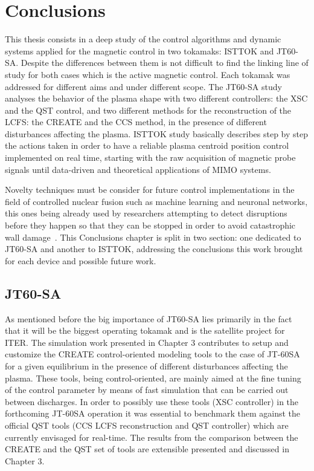 \chapter{Conclusions}

This thesis consists in a deep study of the control algorithms and dynamic systems applied for the magnetic control in two tokamaks: ISTTOK and JT60-SA. Despite the  differences between them is not difficult to find the  linking line of study for both cases which is the active magnetic control. Each tokamak was addressed for different aims and under different scope. The JT60-SA study analyses the behavior of the plasma shape with two different controllers: the XSC and the QST control, and two different methods for the reconstruction of the LCFS: the CREATE and the CCS method, in the presence of different disturbances affecting the plasma. ISTTOK study basically describes step by step the actions taken in order to have a reliable plasma centroid position control implemented on real time, starting with the raw acquisition of magnetic probe signals until  data-driven and theoretical applications of MIMO systems. \smallskip

Novelty techniques must be consider for future control implementations in the field of controlled nuclear fusion  such as machine learning and neuronal networks, this ones being already  used by researchers  attempting to detect disruptions before they happen so that they can be stopped in order to avoid catastrophic wall damage~\cite[Chapter~6]{Paluszek2020}. This Conclusions chapter is split in two section: one dedicated to JT60-SA and another to ISTTOK, addressing the conclusions  this work brought for each device and possible future work.

\section{JT60-SA}

As mentioned before the big importance of JT60-SA  lies primarily in the fact that it will be the biggest operating tokamak and is the satellite project for ITER. The simulation work presented in Chapter 3 contributes to setup and customize the CREATE control-oriented modeling tools to the case of JT-60SA for a given equilibrium in the presence of different disturbances affecting the plasma. These tools, being control-oriented, are mainly aimed at the fine tuning of the control parameter by means of fast simulation that can be carried out between discharges. In order to possibly use these tools (XSC controller) in the forthcoming JT-60SA operation it was essential to benchmark them against the official QST tools (CCS LCFS reconstruction and QST controller) which are currently envisaged for real-time. The results from the comparison between the CREATE and the QST set of tools are extensible presented and discussed in Chapter 3.\smallskip

